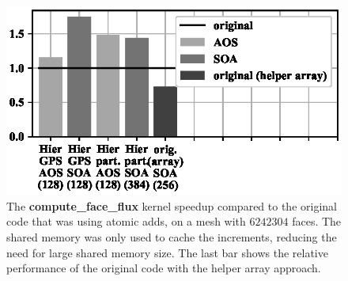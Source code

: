 
\begin{figure}[Htbp]
  \centering
  \includegraphics{fig/mini_aero_speedup_nocache.eps}
  \caption{The \textbf{compute\_face\_flux} kernel speedup compared to the
  original code that was using atomic adds, on a mesh with
  $6242304$ faces. The shared memory was only used to cache the increments,
  reducing the need for large shared memory size. The last bar shows the
  relative performance of the original code with the helper array approach.}
  \label{fig:mini_aero_speedup_small-cache}
\end{figure}

